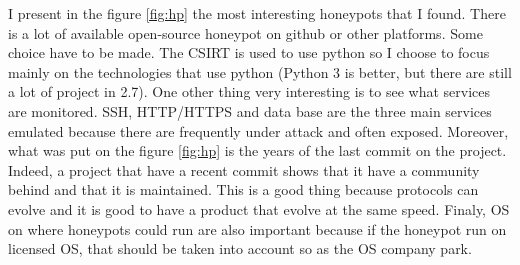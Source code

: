 \documentclass{tnreport}
\begin{document}
I present in the figure \ref{fig:hp} the most interesting honeypots that I found. There is a lot of available open-source honeypot on github or other platforms. Some choice have to be made. The CSIRT is used to use python so I choose to focus mainly on the technologies that use python (Python 3 is better, but there are still a lot of project in 2.7). One other thing very interesting is to see what services are monitored. SSH, HTTP/HTTPS and data base are the three main services emulated because there are frequently under attack and often exposed. Moreover, what was put on the figure \ref{fig:hp} is the years of the last commit on the project. Indeed, a project that have a recent commit shows that it have a community behind and that it is maintained. This is a good thing because protocols can evolve and it is good to have a product that evolve at the same speed. Finaly, OS on where honeypots could run are also important because if the honeypot run on licensed OS, that should be taken into account so as the OS company park.
\end{document}
